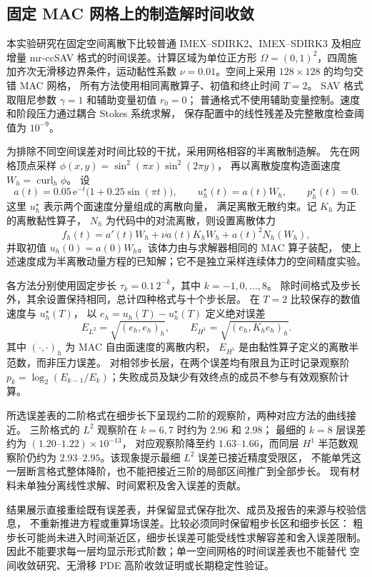 \subsection{固定 MAC 网格上的制造解时间收敛}

本实验研究在固定空间离散下比较普通 IMEX--SDIRK2、IMEX--SDIRK3
及相应增量 mr-ccSAV 格式的时间误差。计算区域为单位正方形
$\Omega=(0,1)^2$，四周施加齐次无滑移边界条件，运动黏性系数
$\nu=0.01$。空间上采用 $128\times128$ 的均匀交错 MAC 网格，
所有方法使用相同离散算子、初值和终止时间 $T=2$。
SAV 格式取阻尼参数 $\gamma=1$ 和辅助变量初值 $r_0=0$；
普通格式不使用辅助变量控制。速度和阶段压力通过耦合 Stokes 系统求解，
保存配置中的线性残差及完整散度检查阈值为 $10^{-9}$。

为排除不同空间误差对时间比较的干扰，采用网格相容的半离散制造解。
先在网格顶点采样
$\phi(x,y)=\sin^2(\pi x)\sin^2(2\pi y)$，
再以离散旋度构造面速度 $W_h=\operatorname{curl}_h\phi$。
设
\begin{equation}
 a(t)=0.05\,\mathrm{e}^{-t}\bigl(1+0.25\sin(\pi t)\bigr),
 \qquad u_h^\star(t)=a(t)W_h,\qquad p_h^\star(t)=0.
\end{equation}
这里 $u_h^\star$ 表示两个面速度分量组成的离散向量，
满足离散无散约束。记 $K_h$ 为正的离散黏性算子，
$N_h$ 为代码中的对流离散，则设置离散体力
\begin{equation}
 f_h(t)=a'(t)W_h+\nu a(t)K_hW_h+a(t)^2N_h(W_h),
\end{equation}
并取初值 $u_h(0)=a(0)W_h$。该体力由与求解器相同的 MAC 算子装配，
使上述速度成为半离散动量方程的已知解；它不是独立采样连续体力的空间精度实验。

各方法分别使用固定步长
$\tau_k=0.1\,2^{-k}$，其中 $k=-1,0,\ldots,8$。
除时间格式及步长外，其余设置保持相同，总计四种格式与十个步长层。
在 $T=2$ 比较保存的数值速度与 $u_h^\star(T)$，
以 $e_h=u_h(T)-u_h^\star(T)$ 定义绝对误差
\begin{equation}
 E_{L^2}=\sqrt{(e_h,e_h)_h},\qquad
 E_{H^1}=\sqrt{(e_h,K_he_h)_h}.
\end{equation}
其中 $(\cdot,\cdot)_h$ 为 MAC 自由面速度的离散内积，
$E_{H^1}$ 是由黏性算子定义的离散半范数，而非压力误差。
对相邻步长层，在两个误差均有限且为正时记录观察阶
$p_k=\log_2(E_{k-1}/E_k)$；失败成员及缺少有效终点的成员不参与有效观察阶计算。

所选误差表的二阶格式在细步长下呈现约二阶的观察阶，两种对应方法的曲线接近。
三阶格式的 $L^2$ 观察阶在 $k=6,7$ 时约为 $2.96$ 和 $2.98$；
最细的 $k=8$ 层误差约为 $(1.20\text{--}1.22)\times10^{-13}$，
对应观察阶降至约 $1.63\text{--}1.66$，而同层 $H^1$ 半范数观察阶仍约为
$2.93\text{--}2.95$。该现象提示最细 $L^2$ 误差已接近精度受限区，
不能单凭这一层断言格式整体降阶，也不能把接近三阶的局部区间推广到全部步长。
现有材料未单独分离线性求解、时间累积及舍入误差的贡献。

结果展示直接重绘既有误差表，并保留显式保存批次、成员及报告的来源与校验信息，
不重新推进方程或重算场误差。比较必须同时保留粗步长区和细步长区：
粗步长可能尚未进入时间渐近区，细步长误差可能受线性求解容差和舍入误差限制。
因此不能要求每一层均显示形式阶数；单一空间网格的时间误差表也不能替代
空间收敛研究、无滑移 PDE 高阶收敛证明或长期稳定性验证。
